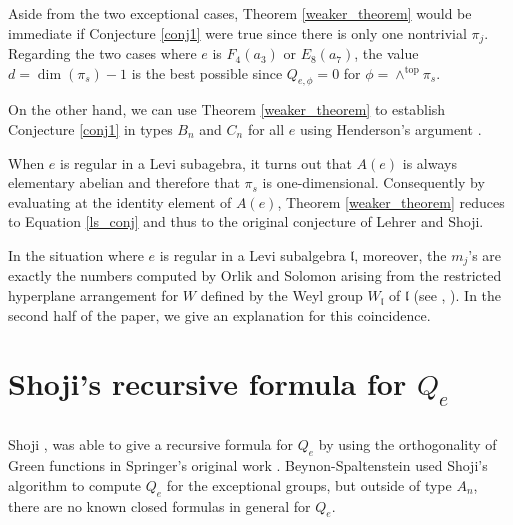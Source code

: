 \documentclass[10pt]{amsart}
\newcommand{\levi}{\mathfrak l}
\newcommand{\flag}{{\mathcal B}}
\theoremstyle{plain}
\theoremstyle{definition}
\theoremstyle{remark}
\begin{document}
Aside from the two exceptional cases, Theorem \ref{weaker_theorem}
would be immediate if Conjecture \ref{conj1} were true since there is only
one nontrivial $\pi_j$.  
Regarding the two cases where $e$ is $F_4(a_3)$ or $E_8(a_7)$, 
the value $d = \dim(\pi_s)-1$ is the best possible 
since $Q_{e,\phi}=0$  for $\phi = \wedge^{\text{top}} \pi_s$.

On the other hand, we can use Theorem \ref{weaker_theorem}
to establish Conjecture \ref{conj1} in types $B_n$ and $C_n$ for all $e$ using Henderson's argument \cite{henderson:exterior}.

When $e$ is regular in a Levi subagebra,  it turns out that
$A(e)$ is always elementary abelian and therefore that $\pi_s$ is one-dimensional. 
Consequently by evaluating at the identity element of $A(e)$, 
Theorem \ref{weaker_theorem} reduces to Equation \ref{ls_conj}
and thus to the original conjecture of Lehrer and Shoji.

In the situation where $e$ is regular in a Levi subalgebra $\levi$, moreover, the $m_j$'s are exactly the numbers computed by Orlik and Solomon arising from the restricted hyperplane arrangement for $W$ defined by the Weyl group $W_{\levi}$ of $\levi$ (see \cite{lehrer-shoji:reflections}, \cite{spaltenstein:reflection}).   
In the second half of the paper, we give an explanation for this coincidence.




\section{\texorpdfstring{Shoji's recursive formula for $Q_e$}{Shoji's recursive formula for Qe}} \label{section:shoji}

\subsection{}

Shoji \cite{shoji:green_f4}, \cite{shoji:green_classical}  was able to give a recursive formula for $Q_e$ by using the orthogonality of Green functions 
in Springer's original work \cite{springer:green}.  Beynon-Spaltenstein \cite{bs:green} used Shoji's algorithm to compute $Q_e$ for 
the exceptional groups, but outside of type $A_n$, there are no known closed formulas in general for $Q_e$.   
\end{document}
